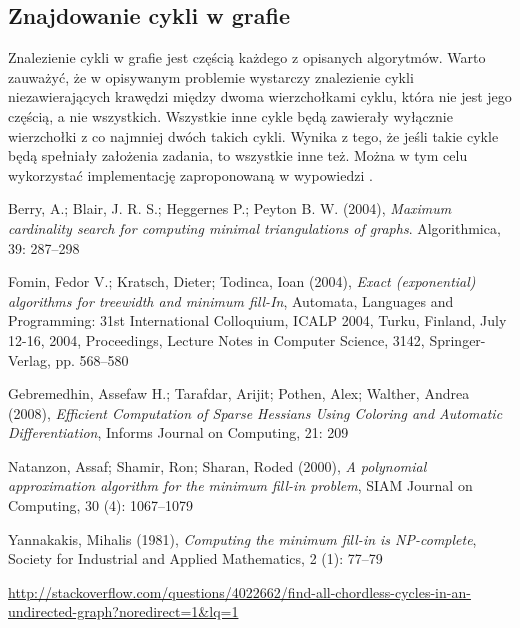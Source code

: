 \documentclass{article}
\begin{document}
\subsection{Znajdowanie cykli w grafie}
Znalezienie cykli w grafie jest częścią każdego z opisanych algorytmów. 
Warto zauważyć, że w opisywanym problemie wystarczy znalezienie cykli niezawierających krawędzi między dwoma wierzchołkami cyklu, która nie jest jego częścią, a nie wszystkich. Wszystkie inne cykle będą zawierały wyłącznie wierzchołki z co najmniej dwóch takich cykli. 
Wynika z tego, że jeśli takie cykle będą spełniały założenia zadania, to wszystkie inne też.
Można w tym celu wykorzystać implementację zaproponowaną w wypowiedzi \cite{Cycles}.



\begin{thebibliography}{20}
Berry, A.; Blair, J. R. S.; Heggernes P.; Peyton B. W. (2004), \textit{Maximum cardinality search for computing minimal triangulations of graphs}.
Algorithmica, 39: 287–298

Fomin, Fedor V.; Kratsch, Dieter; Todinca, Ioan (2004), \textit{Exact (exponential) algorithms for treewidth and minimum fill-In}, Automata, Languages and Programming: 31st International Colloquium, ICALP 2004, Turku, Finland, July 12-16, 2004, Proceedings, Lecture Notes in Computer Science, 3142, Springer-Verlag, pp. 568–580

Gebremedhin, Assefaw H.; Tarafdar, Arijit; Pothen, Alex; Walther, Andrea (2008), \textit{Efficient Computation of Sparse Hessians Using Coloring and Automatic Differentiation}, Informs Journal on Computing, 21: 209

Natanzon, Assaf; Shamir, Ron; Sharan, Roded (2000), \textit{A polynomial approximation algorithm for the minimum fill-in problem}, SIAM Journal on Computing, 30 (4): 1067–1079

Yannakakis, Mihalis (1981), \textit{Computing the minimum fill-in is NP-complete}, Society for Industrial and Applied Mathematics, 2 (1): 77–79

\url{http://stackoverflow.com/questions/4022662/find-all-chordless-cycles-in-an-undirected-graph?noredirect=1\&lq=1}

\end{thebibliography}
\end{document}
